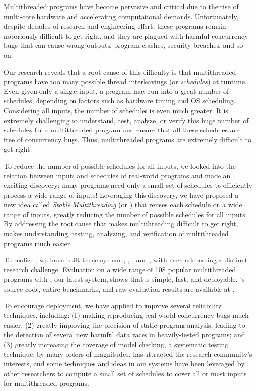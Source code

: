 Multithreaded programs have become pervasive and critical due to the rise of
multi-core hardware and accelerating computational demands.
Unfortunately, despite decades of research and engineering effort, these
programs remain notoriously difficult to get right, and they are plagued with
harmful concurrency bugs that can cause wrong outputs, program crashes, security
breaches, and so on.

Our research reveals that a root cause of this difficulty is
that multithreaded programs have too many possible thread interleavings (or
\emph{schedules}) at runtime. Even given only a single input, a program may run 
into a great number of schedules, depending on factors such as hardware timing 
and OS scheduling. Considering all inputs, the number of schedules is even much 
greater. It is extremely challenging to understand, test, analyze, or verify 
this huge number of schedules for a multithreaded program and ensure that 
all these schedules are free of concurrency bugs. Thus, multithreaded programs 
are extremely difficult to get right.

To reduce the number of possible schedules for all inputs, we looked into the 
relation between inputs and schedules of real-world programs and made an 
exciting discovery: many programs need only a small set of schedules to 
efficiently process a wide range of inputs! Leveraging this discovery, we have 
proposed a new idea called \emph{Stable Multithreading} (or \emph{\smt}) that 
reuses each schedule on a wide range of inputs, greatly reducing the number of 
possible schedules for all inputs. By addressing the root cause that makes 
multithreading difficult to get right, \smt makes understanding, testing, 
analyzing, and verification of multithreaded programs much easier.

To realize \smt, we have built three \smt systems, \tern, \peregrine, and 
\parrot, with each addressing a distinct research challenge. Evaluation on a 
wide range of 108 popular multithreaded programs with \parrot, our latest \smt 
system, shows that \smt is simple, fast, and deployable. \parrot's source 
code, entire benchmarks, and raw evaluation results are available at \github.

To encourage deployment, we have applied \smt to improve several reliability 
techniques, including: (1) making reproducing real-world concurrency bugs much 
easier;  (2) greatly improving the precision of static program analysis, 
leading to the detection of several new harmful data races in heavily-tested 
programs; and (3) greatly increasing the coverage of model checking, a 
systematic testing technique, by many orders of magnitudes. \smt has attracted 
the research community's interests, and some techniques and ideas in our \smt 
systems have been leveraged by other researchers to compute a small set of 
schedules to cover all or most inputs for multithreaded programs.

% 
